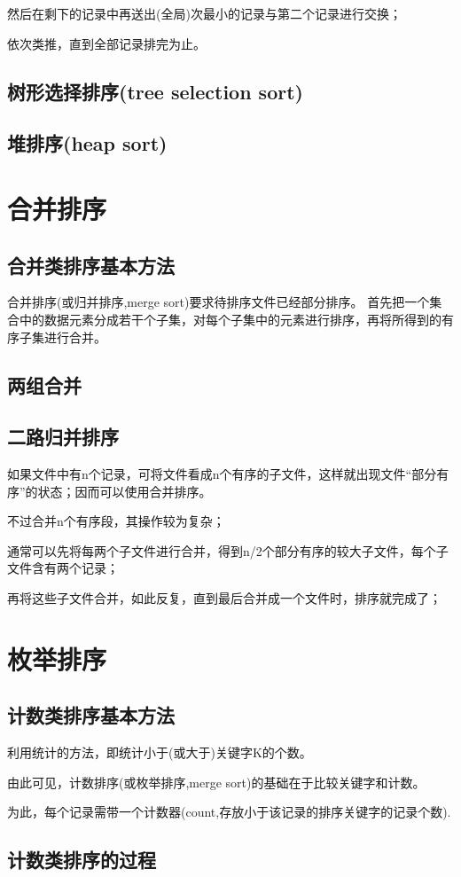 \documentclass[AutoFakeBold]{LZUThesis2007}
\begin{document}
		然后在剩下的记录中再送出(全局)次最小的记录与第二个记录进行交换；
		
		依次类推，直到全部记录排完为止。
		\subsection{树形选择排序(tree selection sort)}
		\subsection{堆排序(heap sort)}	
	\section{合并排序}
		\subsection{合并类排序基本方法}
	合并排序(或归并排序,merge sort)要求待排序文件已经部分排序。
	首先把一个集合中的数据元素分成若干个子集，对每个子集中的元素进行排序，再将所得到的有序子集进行合并。
		\subsection{两组合并}
		\subsection{二路归并排序}	
		如果文件中有n个记录，可将文件看成n个有序的子文件，这样就出现文件“部分有序”的状态；因而可以使用合并排序。
		
		不过合并n个有序段，其操作较为复杂；
		
		通常可以先将每两个子文件进行合并，得到n/2个部分有序的较大子文件，每个子文件含有两个记录；
		
		再将这些子文件合并，如此反复，直到最后合并成一个文件时，排序就完成了；
	\section{枚举排序}
		\subsection{计数类排序基本方法}
		利用统计的方法，即统计小于(或大于)关键字K的个数。
	  
		由此可见，计数排序(或枚举排序,merge sort)的基础在于比较关键字和计数。
		
		为此，每个记录需带一个计数器(count,存放小于该记录的排序关键字的记录个数).
		\subsection{计数类排序的过程}
\end{document}
